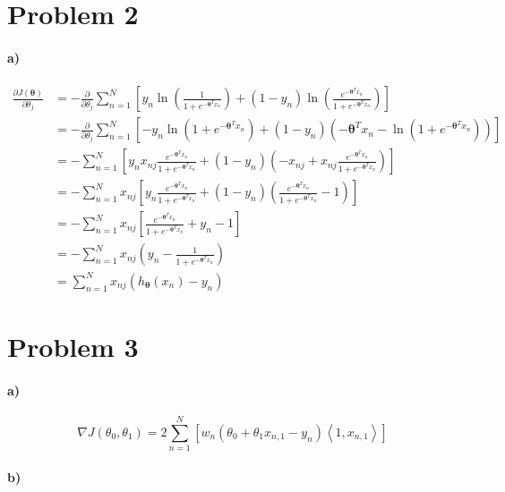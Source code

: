 \documentclass[12pt]{article}
\begin{document}
\section*{Problem 2}

\paragraph{a)}

\begin{align*}
        \frac{\partial J(\pmb{\theta})}{\partial \theta_j}
        &=-\frac{\partial}{\partial \theta_j}\sum_{n=1}^N \left[y_n \ln\left(\frac{1}{1+e^{-\pmb{\theta}^T x_n}}\right)
        +(1-y_n)\ln\left(\frac{e^{-\pmb{\theta}^T x_n}}{1+e^{-\pmb{\theta}^T x_n}}\right)\right]\\
        &=-\frac{\partial}{\partial \theta_j}\sum_{n=1}^N \left[-y_n \ln\left(1+e^{-\pmb{\theta}^T x_n}\right)
        +(1-y_n)\left(-\pmb{\theta}^T x_n-\ln\left(1+e^{-\pmb{\theta}^T x_n}\right)\right)\right]\\
        &=-\sum_{n=1}^N \left[y_nx_{nj}\frac{e^{-\pmb{\theta}^T x_n }}{1+e^{-\pmb{\theta}^T x_n}}
        +(1-y_n)\left(-x_{nj}+x_{nj}\frac{e^{-\pmb{\theta}^T x_n }}{1+e^{-\pmb{\theta}^T x_n}}\right)\right]\\
        &=-\sum_{n=1}^N x_{nj}\left[y_n\frac{e^{-\pmb{\theta}^T x_n }}{1+e^{-\pmb{\theta}^T x_n}}
        +(1-y_n)\left(\frac{e^{-\pmb{\theta}^T x_n }}{1+e^{-\pmb{\theta}^T x_n}}-1\right)\right]\\
        &=-\sum_{n=1}^N x_{nj}\left[\frac{e^{-\pmb{\theta}^T x_n }}{1+e^{-\pmb{\theta}^T x_n}}+y_n-1\right]\\
        &=-\sum_{n=1}^N x_{nj}\left(y_n-\frac{1}{1+e^{-\pmb{\theta}^T x_n}}\right)\\
        &=\sum_{n=1}^N x_{nj}\left(h_{\pmb{\theta}}(x_n)-y_n\right)
\end{align*}

\section*{Problem 3}

\paragraph{a)}

\[\nabla J(\theta_0,\theta_1)=2\sum_{n=1}^N \left[w_n(\theta_0+\theta_1x_{n,1}-y_n)\left<1, x_{n,1}\right>\right]\]

\paragraph{b)}
\end{document}
